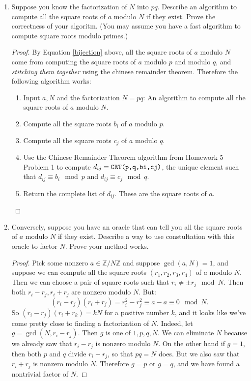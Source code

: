 \documentclass[11pt]{article}
\newcommand{\bZ}{\mathbb{Z}}
\begin{document}
\begin{enumerate}
{\begin{enumerate}
\begin{proof}
      We observe then that the only possibilities for the number of square roots of $a$ are $1,2,4$ (if any), and that this number is controlled exactly by the value of $g$.  Notice that $a$ can never have exactly 3 square roots mod $N$.  Also compare to the case where $p=q$ studied in Homework 3 Problem 7, where the only possibilities were $1$ and $2$.
    \end{proof}
    \item{
    Suppose you know the factorization of $N$ into $pq$.  Describe an algorithm to compute all the square roots of $a$ modulo $N$ if they exist.  Prove the correctness of your algoritm.  (You may assume you have a fast algorithm to compute square roots modulo primes.)
    }
    \begin{proof}
      By Equation \ref{bijection} above, all the square roots of $a$ modulo $N$ come from computing the square roots of $a$ modulo $p$ and modulo $q$, and \textit{stitching them together} using the chinese remainder theorem.  Therefore the following algorithm works:
      \begin{enumerate}[(1)]
        \item{Input $a,N$ and the factorization $N=pq$: An algorithm to compute all the square roots of $a$ modulo $N$.}
        \item{Compute all the square roots $b_i$ of $a$ modulo $p$.}
        \item{Compute all the square roots $c_j$ of $a$ modulo $q$.}
        \item{Use the Chinese Remainder Theorem algorithm from Homework 5 Problem 1 to compute $d_{ij} = \verb|CRT(p,q,bi,cj)|$, the unique element such that $d_{ij}\equiv b_i\mod p$ and $d_{ij}\equiv c_j\mod q$.}
        \item{Return the complete list of $d_{ij}$.  These are the square roots of $a$.}
      \end{enumerate}
    \end{proof}
    \item{
    Conversely, suppose you have an oracle that can tell you all the square roots of $a$ modulo $N$ if they exist.  Describe a way to use constultation with this oracle to factor $N$.  Prove your method works.
    }
    \begin{proof}
      Pick some nonzero $a\in\bZ/N\bZ$ and suppose $\gcd(a,N)=1$, and suppose we can compute all the square roots $(r_1,r_2,r_3,r_4)$ of $a$ modulo $N$.  Then we can choose a pair of square roots such that $r_i\not=\pm r_j\mod N$.  Then both $r_i-r_j,r_i+r_j$ are nonzero modulo $N$.  But:
      \[(r_i-r_j)(r_i+r_j) = r_i^{2}-r_j^2\equiv a-a\equiv0\mod N.\]
      So $(r_i-r_j)(r_i+r_k) = kN$ for a positive number $k$, and it looks like we've come pretty close to finding a factorization of $N$.  Indeed, let $g = \gcd(N,r_i-r_j)$.  Then $g$ is one of $1,p,q,N$.  We can eliminate $N$ because we already saw that $r_i-r_j$ is nonzero modulo $N$.  On the other hand if $g=1$, then both $p$ and $q$ divide $r_i+r_j$, so that $pq=N$ does.  But we also saw that $r_i+r_j$ is nonzero modulo $N$.  Therefore $g=p$ or $g=q$, and we have found a nontrivial factor of $N$.


\end{proof}
\end{enumerate}}
\end{enumerate}
\end{document}
